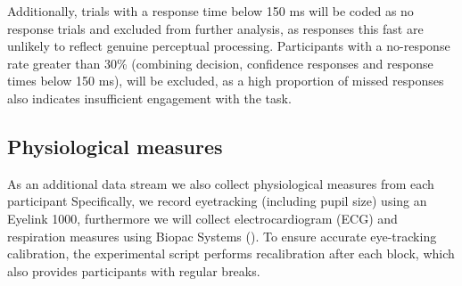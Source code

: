 \documentclass[
]{article}
\begin{document}
Additionally, trials with a response time below 150 ms will be coded as
no response trials and excluded from further analysis, as responses this
fast are unlikely to reflect genuine perceptual processing. Participants
with a no-response rate greater than 30\% (combining decision,
confidence responses and response times below 150 ms), will be excluded,
as a high proportion of missed responses also indicates insufficient
engagement with the task.

\subsection{Physiological measures}\label{physiological-measures}

As an additional data stream we also collect physiological measures from
each participant Specifically, we record eyetracking (including pupil
size) using an Eyelink 1000, furthermore we will collect
electrocardiogram (ECG) and respiration measures using Biopac Systems
(). To ensure accurate eye-tracking calibration, the
experimental script performs recalibration after each block, which also
provides participants with regular breaks.
\end{document}
